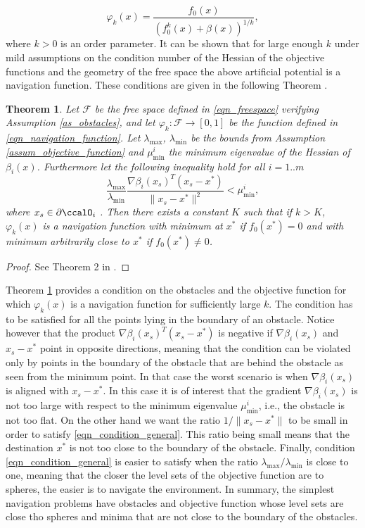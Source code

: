 \documentclass[article]{IEEEtran}
\newtheorem{theorem}{Theorem}
\theoremstyle{definition}
\begin{document}
%
\begin{equation}\label{eqn_navigation_function}
\varphi_k(x) = \frac{f_0(x)}{\left(f_0^k(x) + \beta(x)\right)^{1/k}},
\end{equation}
%  
where $k>0$ is an order parameter. It can be shown that for large enough $k$ under mild assumptions on the condition number of the Hessian of the objective functions and the geometry of the free space the above artificial potential is a navigation function. These conditions are given in the following Theorem \cite{PaternainEtal15}.
%
\begin{theorem}\label{theo_navigation_function}
Let $\mathcal{F}$ be the free space defined in \eqref{eqn_freespace} verifying Assumption \ref{as_obstacles}, and let $\varphi_k: \mathcal{F} \rightarrow [0,1]$ be the function defined in \eqref{eqn_navigation_function}. Let $\lambda_{\max}$, $\lambda_{\min}$ be the bounds from Assumption \ref{assum_objective_function} and $\mu^i_{\min}$ the minimum eigenvalue of the Hessian of $\beta_i(x)$. Furthermore let the following inequality hold for all $i=1..m$
%
\begin{equation}\label{eqn_condition_general}
\frac{\lambda_{\max}}{\lambda_{\min}} \frac{\nabla \beta_i(x_s)^T(x_s-x^*)}{\|x_s - x^*\|^2}< \mu^i_{\min},
\end{equation}
%
where $x_s\in \partial \ccalO_i$ . Then there exists a constant $K$ such that if $k>K$, $\varphi_k(x)$ is a navigation function with minimum at $x^*$ if $f_0(x^*) =0$ and with minimum arbitrarily close to $x^*$ if $f_0(x^*) \neq 0$. 
\end{theorem}
\begin{proof}
See Theorem 2 in \cite{PaternainEtal15}.
\end{proof}
%
Theorem \ref{theo_navigation_function} provides a condition on the obstacles and the objective function for which $\varphi_k(x)$ is a navigation function for sufficiently large $k$. The condition has to be satisfied for all the points lying in the boundary of an obstacle. Notice however that the product $\nabla \beta_i(x_s)^T(x_s - x^*)$ is negative if $\nabla \beta_i(x_s)$ and $x_s-x^*$ point in opposite directions, meaning that the condition can be violated only by points in the boundary of the obstacle that are behind the obstacle as seen from the minimum point. In that case the worst scenario is when $\nabla \beta_i(x_s)$ is aligned with $x_s - x^*$. In this case it is of interest that the gradient $\nabla \beta_i(x_s)$ is not too large with respect to the minimum eigenvalue $\mu^i_{\min}$, i.e., the obstacle is not too flat. On the other hand we want the ratio $1/\|x_s-x^*\|$ to be small in order to satisfy \eqref{eqn_condition_general}. This ratio being small means that the destination $x^*$ is not too close to the boundary of the obstacle. Finally, condition \eqref{eqn_condition_general} is easier to satisfy when the ratio $\lambda_{\max}/\lambda_{\min}$ is close to one, meaning that the closer the level sets of the objective function are to spheres, the easier is to navigate the environment. In summary, the simplest navigation problems have obstacles and objective function whose level sets are close tho spheres and minima that are not close to the boundary of the obstacles.
\end{document}
